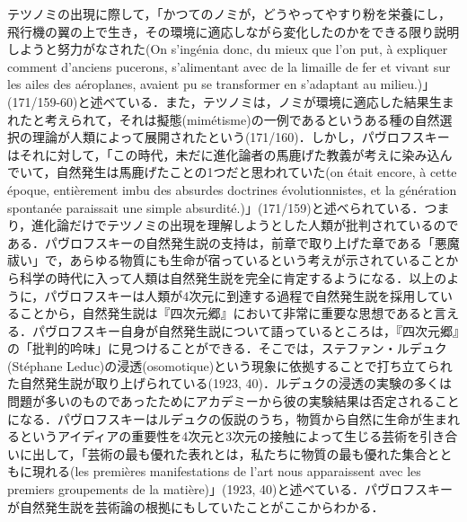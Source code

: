 テツノミの出現に際して，「かつてのノミが，どうやってやすり粉を栄養にし，飛行機の翼の上で生き，その環境に適応しながら変化したのかをできる限り説明しようと努力がなされた(On s'ingénia donc, du mieux que l'on put, à expliquer comment d'anciens pucerons, s'alimentant avec de la limaille de fer et vivant sur les ailes des aéroplanes, avaient pu se transformer en s'adaptant au milieu.)」(171/159-60)と述べている．また，テツノミは，ノミが環境に適応した結果生まれたと考えられて，それは擬態(mimétisme)の一例であるというある種の自然選択の理論が人類によって展開されたという(171/160)．しかし，パヴロフスキーはそれに対して，「この時代，未だに進化論者の馬鹿げた教義が考えに染み込んでいて，自然発生は馬鹿げたことの1つだと思われていた(on était encore, à cette époque, entièrement imbu des absurdes doctrines évolutionnistes, et la génération spontanée paraissait une simple absurdité.)」(171/159)と述べられている．つまり，進化論だけでテツノミの出現を理解しようとした人類が批判されているのである．パヴロフスキーの自然発生説の支持は，前章で取り上げた章である「悪魔祓い」で，あらゆる物質にも生命が宿っているという考えが示されていることから科学の時代に入って人類は自然発生説を完全に肯定するようになる．以上のように，パヴロフスキーは人類が4次元に到達する過程で自然発生説を採用していることから，自然発生説は『四次元郷』において非常に重要な思想であると言える．パヴロフスキー自身が自然発生説について語っているところは，『四次元郷』の「批判的吟味」に見つけることができる．そこでは，ステファン・ルデュク(Stéphane Leduc)の浸透(osomotique)という現象に依拠することで打ち立てられた自然発生説が取り上げられている(1923, 40)．ルデュクの浸透の実験の多くは問題が多いのものであったためにアカデミーから彼の実験結果は否定されることになる．パヴロフスキーはルデュクの仮説のうち，物質から自然に生命が生まれるというアイディアの重要性を4次元と3次元の接触によって生じる芸術を引き合いに出して，「芸術の最も優れた表れとは，私たちに物質の最も優れた集合とともに現れる(les premières manifestations de l'art nous apparaissent avec les premiers groupements de la matière)」(1923, 40)と述べている．パヴロフスキーが自然発生説を芸術論の根拠にもしていたことがここからわかる．

